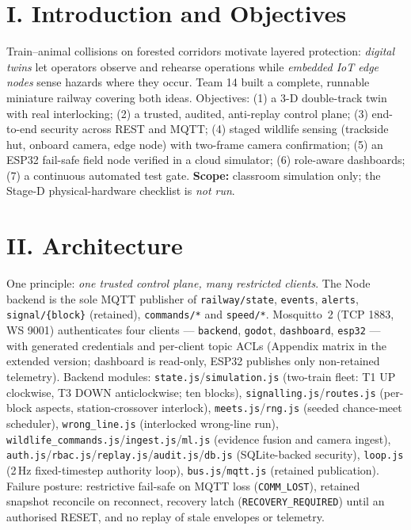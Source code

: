 \documentclass[10pt,a4paper,twocolumn]{article}
\newcommand{\sect}[1]{\section{#1}}
\begin{document}
\sect{I. Introduction and Objectives}
Train--animal collisions on forested corridors motivate layered protection: \emph{digital twins} let operators observe and rehearse operations while \emph{embedded IoT edge nodes} sense hazards where they occur. Team 14 built a complete, runnable miniature railway covering both ideas. Objectives: (1) a 3-D double-track twin with real interlocking; (2) a trusted, audited, anti-replay control plane; (3) end-to-end security across REST and MQTT; (4) staged wildlife sensing (trackside hut, onboard camera, edge node) with two-frame camera confirmation; (5) an ESP32 fail-safe field node verified in a cloud simulator; (6) role-aware dashboards; (7) a continuous automated test gate. \textbf{Scope:} classroom simulation only; the Stage-D physical-hardware checklist is \emph{not run}.

\sect{II. Architecture}
One principle: \emph{one trusted control plane, many restricted clients}. The Node backend is the sole MQTT publisher of \texttt{railway/state}, \texttt{events}, \texttt{alerts}, \texttt{signal/\{block\}} (retained), \texttt{commands/*} and \texttt{speed/*}. Mosquitto~2 (TCP 1883, WS 9001) authenticates four clients --- \texttt{backend}, \texttt{godot}, \texttt{dashboard}, \texttt{esp32} --- with generated credentials and per-client topic ACLs (Appendix matrix in the extended version; dashboard is read-only, ESP32 publishes only non-retained telemetry). Backend modules: \texttt{state.js}/\texttt{simulation.js} (two-train fleet: T1 UP clockwise, T3 DOWN anticlockwise; ten blocks), \texttt{signalling.js}/\texttt{routes.js} (per-block aspects, station-crossover interlock), \texttt{meets.js}/\texttt{rng.js} (seeded chance-meet scheduler), \texttt{wrong\_line.js} (interlocked wrong-line run), \texttt{wildlife\_commands.js}/\texttt{ingest.js}/\texttt{ml.js} (evidence fusion and camera ingest), \texttt{auth.js}/\texttt{rbac.js}/\texttt{replay.js}/\texttt{audit.js}/\texttt{db.js} (SQLite-backed security), \texttt{loop.js} (2\,Hz fixed-timestep authority loop), \texttt{bus.js}/\texttt{mqtt.js} (retained publication). Failure posture: restrictive fail-safe on MQTT loss (\texttt{COMM\_LOST}), retained snapshot reconcile on reconnect, recovery latch (\texttt{RECOVERY\_REQUIRED}) until an authorised RESET, and no replay of stale envelopes or telemetry.
\end{document}
